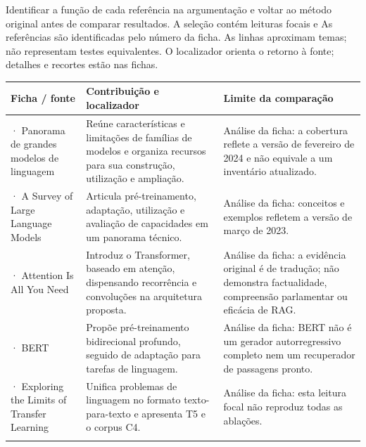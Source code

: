 Identificar a função de cada referência na argumentação e voltar ao método original antes de comparar resultados. A seleção contém leituras focais e
\clearpage
{}
As referências são identificadas pelo número da ficha. As linhas aproximam temas; não representam testes equivalentes. O localizador orienta o retorno à fonte; detalhes e recortes estão nas fichas.

{\small\renewcommand{\arraystretch}{1.3}
\begin{tabularx}{\textwidth}{@{}>{\raggedright\arraybackslash}p{29mm}>{\raggedright\arraybackslash}X>{\raggedright\arraybackslash}X@{}}
\toprule
\textbf{Ficha / fonte} & \textbf{Contribuição e localizador} & \textbf{Limite da comparação}\\
\midrule
25 · Panorama de grandes modelos de linguagem & Reúne características e limitações de famílias de modelos e organiza recursos para sua construção, utilização e ampliação.\par\smallskip{\footnotesize Resumo} & Análise da ficha: a cobertura reflete a versão de fevereiro de 2024 e não equivale a um inventário atualizado.\\
\addlinespace[5pt]
30 · A Survey of Large Language Models & Articula pré-treinamento, adaptação, utilização e avaliação de capacidades em um panorama técnico.\par\smallskip{\footnotesize Resumo} & Análise da ficha: conceitos e exemplos refletem a versão de março de 2023.\\
\addlinespace[5pt]
31 · Attention Is All You Need & Introduz o Transformer, baseado em atenção, dispensando recorrência e convoluções na arquitetura proposta.\par\smallskip{\footnotesize Resumo} & Análise da ficha: a evidência original é de tradução; não demonstra factualidade, compreensão parlamentar ou eficácia de RAG.\\
\addlinespace[5pt]
36 · BERT & Propõe pré-treinamento bidirecional profundo, seguido de adaptação para tarefas de linguagem.\par\smallskip{\footnotesize Resumo} & Análise da ficha: BERT não é um gerador autorregressivo completo nem um recuperador de passagens pronto.\\
\addlinespace[5pt]
37 · Exploring the Limits of Transfer Learning & Unifica problemas de linguagem no formato texto-para-texto e apresenta T5 e o corpus C4.\par\smallskip{\footnotesize Resumo} & Análise da ficha: esta leitura focal não reproduz todas as ablações.\\
\addlinespace[5pt]
\bottomrule
\end{tabularx}}

